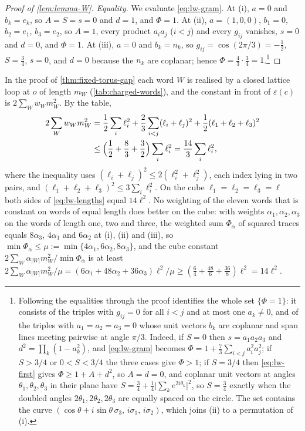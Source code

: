\documentclass[11pt,a4paper]{amsart}
\theoremstyle{definition}
\theoremstyle{remark}
\numberwithin{equation}{section}
\newcommand{\abs}[1]{\lvert #1\rvert}      %
\begin{document}
\begin{proof}[Proof of \cref{lem:lemma-W}]
\emph{Equality.} We evaluate \eqref{eq:lw-gram}. At (i), $a=0$ and $b_k=e_k$, so $A=S=s=0$ and $d=1$, and $\Phi=1$. At (ii), $a=(1,0,0)$, $b_1=0$, $b_2=e_1$, $b_3=e_2$, so $A=1$, every product $a_ia_j$ ($i<j$) and every $g_{ij}$ vanishes, $s=0$ and $d=0$, and $\Phi=1$. At (iii), $a=0$ and $b_k=n_k$, so $g_{ij}=\cos(2\pi/3)=-\frac12$, $S=\frac34$, $s=0$, and $d=0$ because the $n_k$ are coplanar; hence $\Phi=\frac43\cdot\frac34=1$.\footnote{Following the equalities through the proof identifies the whole set $\{\Phi=1\}$: it consists of the triples with $g_{ij}=0$ for all $i<j$ and at most one $a_k\neq0$, and of the triples with $a_1=a_2=a_3=0$ whose unit vectors $b_k$ are coplanar and span lines meeting pairwise at angle $\pi/3$. Indeed, if $S=0$ then $s=a_1a_2a_3$ and $d^2=\prod_k(1-a_k^2)$, and \eqref{eq:lw-gram} becomes $\Phi=1+\frac73\sum_{i<j}a_i^2a_j^2$; if $S>3/4$ or $0<S<3/4$ the three cases give $\Phi>1$; if $S=3/4$ then \eqref{eq:lw-first} gives $\Phi\ge1+A+d^2$, so $A=d=0$, and coplanar unit vectors at angles $\theta_1,\theta_2,\theta_3$ in their plane have $S=\frac34+\frac14\abs{\sum_ke^{2i\theta_k}}^2$, so $S=\frac34$ exactly when the doubled angles $2\theta_1,2\theta_2,2\theta_3$ are equally spaced on the circle. The set contains the curve $(\cos\theta+i\sin\theta\,\sigma_3,\,i\sigma_1,\,i\sigma_2)$, which joins (ii) to a permutation of (i).}
\end{proof}

In the proof of \cref{thm:fixed-torus-gap} each word $W$ is realised by a closed lattice loop at $o$ of length $m_W$ (\cref{tab:charged-words}), and the constant in front of $\varepsilon(c)$ is $2\sum_Ww_Wm_W^2$. By the table,
\begin{equation}\label{eq:lw-lengths}
\begin{split}
2\sum_Ww_Wm_W^2&=\frac12\sum_i\ell_i^2+\frac23\sum_{i<j}(\ell_i+\ell_j)^2+\frac12(\ell_1+\ell_2+\ell_3)^2\\
&\le\Bigl(\frac12+\frac83+\frac32\Bigr)\sum_i\ell_i^2=\frac{14}{3}\sum_i\ell_i^2,
\end{split}
\end{equation}
where the inequality uses $(\ell_i+\ell_j)^2\le2(\ell_i^2+\ell_j^2)$, each index lying in two pairs, and $(\ell_1+\ell_2+\ell_3)^2\le3\sum_i\ell_i^2$. On the cube $\ell_1=\ell_2=\ell_3=\ell$ both sides of \eqref{eq:lw-lengths} equal $14\ell^2$. No weighting of the eleven words that is constant on words of equal length does better on the cube: with weights $\alpha_1,\alpha_2,\alpha_3$ on the words of length one, two and three, the weighted sum $\Phi_\alpha$ of squared traces equals $8\alpha_3$, $4\alpha_1$ and $6\alpha_2$ at (i), (ii) and (iii), so $\min\Phi_\alpha\le\mu:=\min\{4\alpha_1,6\alpha_2,8\alpha_3\}$, and the cube constant $2\sum_W\alpha_{\abs{W}}m_W^2/\min\Phi_\alpha$ is at least $2\sum_W\alpha_{\abs{W}}m_W^2/\mu=(6\alpha_1+48\alpha_2+36\alpha_3)\ell^2/\mu\ge(\frac64+\frac{48}6+\frac{36}8)\ell^2=14\ell^2$.
\end{document}
